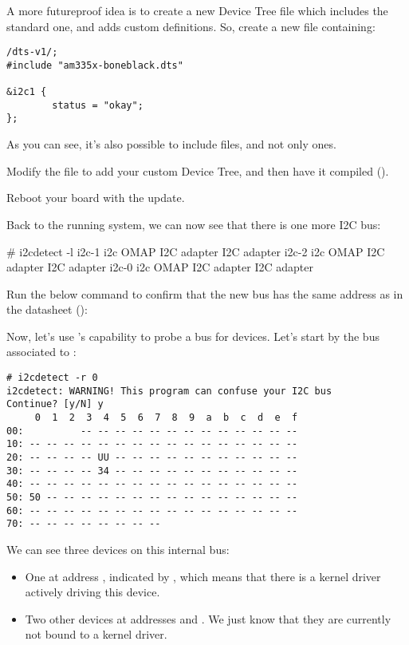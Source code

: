 {A more futureproof idea is to create a new Device Tree file which
includes the standard one, and adds custom definitions. So, create a
new  file containing:

\begin{verbatim}
/dts-v1/;
#include "am335x-boneblack.dts"

&i2c1 {
        status = "okay";
};
\end{verbatim}

As you can see, it's also possible to include  files, and not
only  ones.

Modify the  file to add your custom
Device Tree, and then have it compiled ().

Reboot your board with the update.

Back to the running system, we can now see that there is one more
I2C bus:

\begin{bashinput}
# i2cdetect -l
i2c-1	i2c             OMAP I2C adapter                        I2C adapter
i2c-2	i2c             OMAP I2C adapter                        I2C adapter
i2c-0	i2c             OMAP I2C adapter                        I2C adapter
\end{bashinput}

Run the below command to confirm that the new bus has the same address
as in the datasheet ():


Now, let's use 's capability to probe a bus for devices.
Let's start by the bus associated to :

\begin{verbatim}
# i2cdetect -r 0
i2cdetect: WARNING! This program can confuse your I2C bus
Continue? [y/N] y
     0  1  2  3  4  5  6  7  8  9  a  b  c  d  e  f
00:          -- -- -- -- -- -- -- -- -- -- -- -- --
10: -- -- -- -- -- -- -- -- -- -- -- -- -- -- -- --
20: -- -- -- -- UU -- -- -- -- -- -- -- -- -- -- --
30: -- -- -- -- 34 -- -- -- -- -- -- -- -- -- -- --
40: -- -- -- -- -- -- -- -- -- -- -- -- -- -- -- --
50: 50 -- -- -- -- -- -- -- -- -- -- -- -- -- -- --
60: -- -- -- -- -- -- -- -- -- -- -- -- -- -- -- --
70: -- -- -- -- -- -- -- --
\end{verbatim}

We can see three devices on this internal bus:
\begin{itemize}
\item One at address , indicated by ,
      which means that there is a kernel driver actively
      driving this device.
\item Two other devices at addresses  and .
      We just know that they are currently not bound to a kernel driver.
\end{itemize}

}
